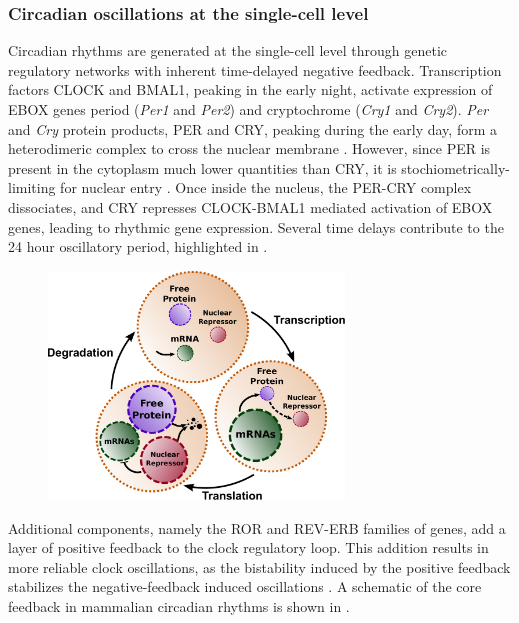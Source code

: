 \subsubsection{Circadian oscillations at the single-cell level}
Circadian rhythms are generated at the single-cell level through genetic regulatory networks with inherent time-delayed negative feedback. 
Transcription factors CLOCK and BMAL1, peaking in the early night, activate expression of EBOX genes period ({\itshape Per1} and {\itshape Per2}) and cryptochrome ({\itshape Cry1} and {\itshape Cry2}). 
{\itshape Per} and {\itshape Cry} protein products, PER and CRY, peaking during the early day, form a heterodimeric complex to cross the nuclear membrane \cite{Ko2006}. 
However, since PER is present in the cytoplasm much lower quantities than CRY, it is stochiometrically-limiting for nuclear entry \cite{Lee2001}. 
Once inside the nucleus, the PER-CRY complex dissociates, and CRY represses CLOCK-BMAL1 mediated activation of EBOX genes, leading to rhythmic gene expression.
Several time delays contribute to the 24 hour oscillatory period, highlighted in .

\begin{figure}[tbp]
  \centering
  \includegraphics[width=0.7\textwidth]{chap1/figures/maindelays.pdf}
  \label{fig:maindelays}
\end{figure}

Additional components, namely the ROR and REV-ERB families of genes, add a layer of positive feedback to the clock regulatory loop.
This addition results in more reliable clock oscillations, as the bistability induced by the positive feedback stabilizes the negative-feedback induced oscillations \cite{Ananthasubramaniam2014a}.
A schematic of the core feedback in mammalian circadian rhythms is shown in .

